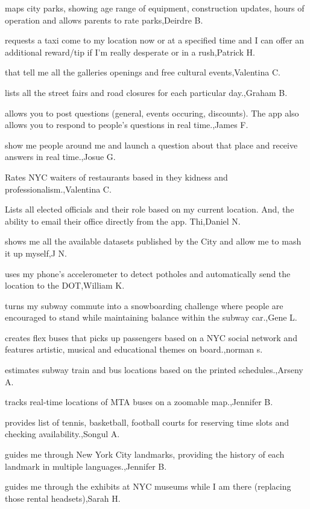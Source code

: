\documentclass{article}
\begin{document}
maps city parks, showing age range of equipment, construction updates, hours of operation and allows parents to rate parks,Deirdre B.

requests a taxi come to my location now or at a specified time and I can offer an additional reward/tip if I'm really desperate or in a rush,Patrick H.

that tell me all the galleries openings and free cultural events,Valentina C.

lists all the street fairs and road closures for each particular day.,Graham B.

allows you to post questions (general, events occuring, discounts). The app also allows you to respond to people's questions in real time.,James F.

show me people around me and launch a question about that place and receive answers in real time.,Josue G.

Rates NYC waiters of restaurants based in they kidness and professionalism.,Valentina C.

Lists all elected officials and their role based on my current location. And, the ability to email their office directly from the app.   Thi,Daniel N.

shows me all the available datasets published by the City and allow me to mash it up myself,J N.

uses my phone's accelerometer to detect potholes and automatically send the location to the DOT,William K.

turns my subway commute into a snowboarding challenge where people are encouraged to stand while maintaining balance within the subway car.,Gene L.

creates flex buses that picks up passengers based on a NYC social network and features artistic, musical  and educational themes on board.,norman s.

estimates subway train and bus locations based on the printed schedules.,Arseny A.

tracks real-time locations of MTA buses on a zoomable map.,Jennifer B.

provides list of tennis, basketball, football courts for reserving time slots and checking availability.,Songul A.

guides me through New York City landmarks, providing the history of each landmark in multiple languages.,Jennifer B.

guides me through the exhibits at NYC museums while I am there (replacing those rental headsets),Sarah H.
\end{document}
